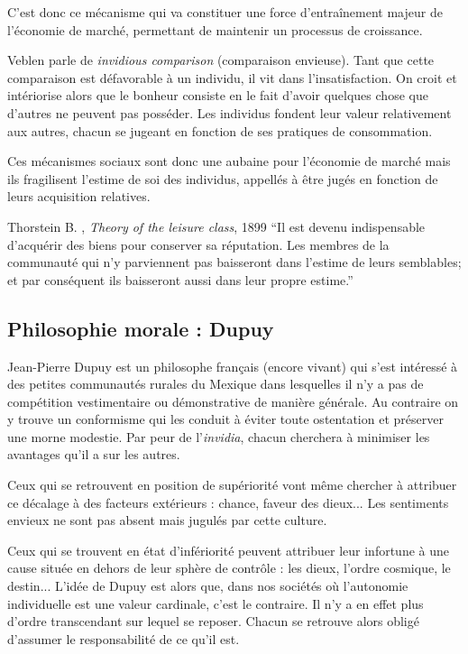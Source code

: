 	C'est donc ce mécanisme qui va constituer une force d'entraînement majeur de l'économie de marché, permettant de maintenir un processus de croissance.

	Veblen parle de \textit{invidious comparison} (comparaison envieuse).
	Tant que cette comparaison est défavorable à un individu, il vit dans l'insatisfaction.
	On croit et intériorise alors que le bonheur consiste en le fait d'avoir quelques chose que d'autres ne peuvent pas posséder.
	Les individus fondent leur valeur relativement aux autres, chacun se jugeant en fonction de ses pratiques de consommation.
	
	Ces mécanismes sociaux sont donc une aubaine pour l'économie de marché mais ils fragilisent l'estime de soi des individus, appellés à être jugés en fonction de leurs acquisition relatives.
	
	\begin{aquote}{Thorstein B. , \textit{Theory of the leisure class}, 1899}
	“Il est devenu indispensable d’acquérir des biens pour conserver sa réputation. Les membres de la communauté qui n’y parviennent pas baisseront dans l’estime de leurs semblables; et par conséquent ils baisseront aussi dans leur propre estime.”
	\end{aquote}

\subsection{Philosophie morale : Dupuy}

	Jean-Pierre Dupuy est un philosophe français (encore vivant) qui s'est intéressé à des petites communautés rurales du Mexique dans lesquelles il n'y a pas de compétition vestimentaire ou démonstrative de manière générale.
	Au contraire on y trouve un conformisme qui les conduit à éviter toute ostentation et préserver une morne modestie.
	Par peur de l'\textit{invidia}, chacun cherchera à minimiser les avantages qu'il a sur les autres.

	Ceux qui se retrouvent en position de supériorité vont même chercher à attribuer ce décalage à des facteurs extérieurs : chance, faveur des dieux...
	Les sentiments envieux ne sont pas absent mais jugulés par cette culture.

	Ceux qui se trouvent en état d'infériorité peuvent attribuer leur infortune à une cause située en dehors de leur sphère de contrôle : les dieux, l'ordre cosmique, le destin...
	L'idée de Dupuy est alors que, dans nos sociétés où l'autonomie individuelle est une valeur cardinale, c'est le contraire.
	Il n'y a en effet plus d'ordre transcendant sur lequel se reposer.
	Chacun se retrouve alors obligé d'assumer le responsabilité de ce qu'il est.

